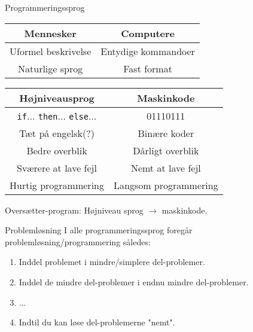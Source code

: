 \documentclass[10pt]{beamer}
\begin{document}
\begin{frame}[fragile]{Programmeringssprog}
\begin{center}
	\begin{tabular}{c|c}
		\textbf{Mennesker}						& 				\textbf{Computere}			\\\hline
		Uformel beskrivelse 					& 				Entydige kommandoer			\\
		Naturlige sprog 						& 				Fast format
	\end{tabular}
\end{center}

\begin{center}
	\begin{tabular}{c|c}
		\textbf{Højniveausprog}												& 			\textbf{Maskinkode}				\\\hline
		\texttt{if}$\dots$ \texttt{then}$\dots$ \texttt{else}$\dots$		&			01110111 						\\
		Tæt på engelsk(?) 													& 			Binære koder					\\
		Bedre overblik 														& 			Dårligt overblik				\\
		Sværere at lave fejl 												& 			Nemt at lave fejl				\\
		Hurtig programmering 												& 			Langsom programmering			\\
	\end{tabular}
\end{center}

\bigskip
Oversætter-program: Højniveau sprog $\rightarrow$ maskinkode.
\end{frame}

\begin{frame}{Problemløsning}
I alle programmeringssprog foregår problemløsning/programmering således:

\begin{enumerate}
	\item Inddel problemet i mindre/simplere del-problemer.
	
	\item Inddel de mindre del-problemer i endnu mindre del-problemer.
	
	\item ... 
	
	\item Indtil du kan løse del-problemerne "nemt".
\end{enumerate}

\end{frame}

\end{document}
